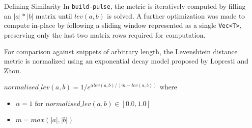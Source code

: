 \documentclass[final]{beamer}
\newlength{\colwidth}
\begin{document}
\begin{frame}[t]
\begin{columns}[t]
\begin{column}{\colwidth}
\begin{block}{Defining Similarity}
          In \texttt{build-pulse}, the metric is iteratively
          computed\cite{levenshtein} by filling an $|a|*|b|$ matrix until $lev(a,
          b)$ is solved. A further optimization was made to compute in-place by
          following a sliding window represented as a single \texttt{Vec<T>},
          preserving only the last two matrix rows required for computation.

          For comparison against snippets of arbitrary length, the Levenshtein
          distance metric is normalized using an exponential decay model
          proposed by Lopresti and Zhou\cite{normalization}.

          \begin{math}
            normalised\_lev(a, b) = 1/e^{\alpha lev(a, b)/(m - lev(a, b))}
          \end{math}
          where
          \begin{itemize}
            \item $\alpha = 1$ for $normalised\_lev(a, b) \in [0.0, 1.0]$
            \item $m = max(|a|, |b|)$
          \end{itemize}
        \end{block}


\end{column}
\end{columns}
\end{frame}
\end{document}
